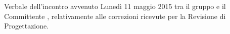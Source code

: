 Verbale dell'incontro avvenuto Lunedì 11 maggio 2015 tra il gruppo \gruppo e il Committente \committenteAlt, relativamente alle correzioni ricevute per la Revisione di Progettazione.